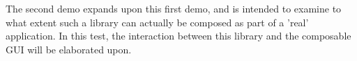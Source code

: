 The second demo expands upon this first demo, and is intended to examine to what extent such a library can actually be composed as part of a 'real' application. 
In this test, the interaction between this library and the composable \ac{GUI} will be elaborated upon.







